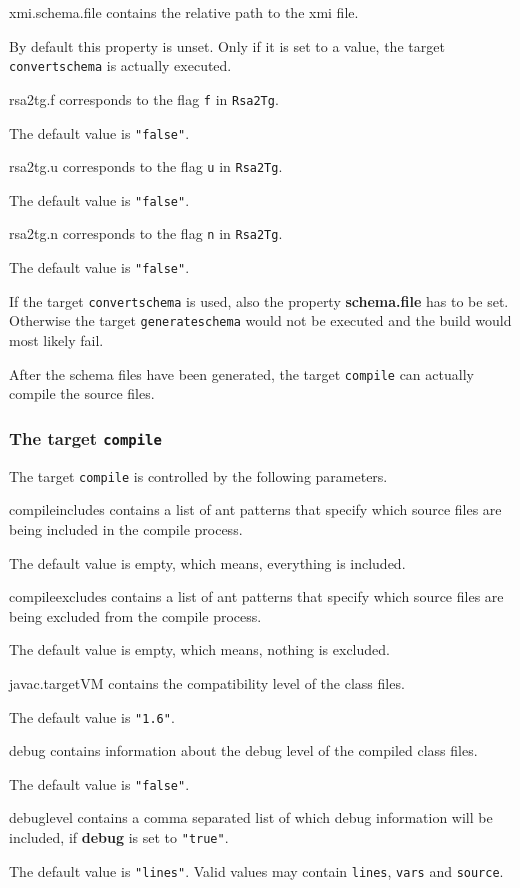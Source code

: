\documentclass[a4paper,twoside,11pt,bibtotoc]{article}
\begin{document}
\begin{description*}
	\item[xmi.schema.file] contains the relative path to the xmi file.\par By default this property is unset. Only if it is set to a value, the target \texttt{convertschema} is actually executed.
	\item[rsa2tg.f] corresponds to the flag \texttt{f} in \texttt{Rsa2Tg}.\par The default value is \texttt{"false"}.
	\item[rsa2tg.u] corresponds to the flag \texttt{u} in \texttt{Rsa2Tg}.\par The default value is \texttt{"false"}.
	\item[rsa2tg.n] corresponds to the flag \texttt{n} in \texttt{Rsa2Tg}.\par The default value is \texttt{"false"}.
\end{description*}

If the target \texttt{convertschema} is used, also the property \textbf{schema.file} has to be set.
Otherwise the target \texttt{generateschema} would not be executed and the build would most likely fail.

After the schema files have been generated, the target \texttt{compile} can actually compile the source files.
\subsubsection{The target \texttt{compile}}
\label{sec:compile}
The target \texttt{compile} is controlled by the following parameters.

\begin{description*}
	\item[compileincludes] contains a list of ant patterns that specify which source files are being included in the compile process.\par The default value is empty, which means, everything is included.
	\item[compileexcludes] contains a list of ant patterns that specify which source files are being excluded from the compile process.\par The default value is empty, which means, nothing is excluded.
	\item[javac.targetVM] contains the compatibility level of the class files.\par The default value is \texttt{"1.6"}.
	\item[debug] contains information about the debug level of the compiled class files.\par The default value is \texttt{"false"}.
	\item[debuglevel] contains a comma separated list of which debug information will be included, if \textbf{debug} is set to \texttt{"true"}.\par The default value is \texttt{"lines"}. Valid values may contain \texttt{lines}, \texttt{vars} and \texttt{source}.
\end{description*}
\end{document}
